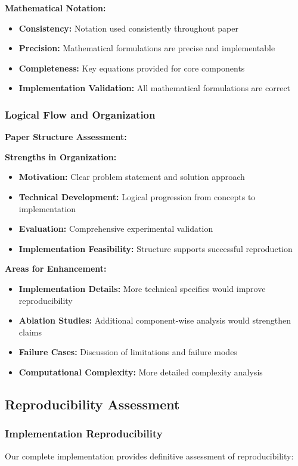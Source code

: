 \textbf{Mathematical Notation:}
\begin{itemize}
    \item \textbf{Consistency:} Notation used consistently throughout paper
    \item \textbf{Precision:} Mathematical formulations are precise and implementable
    \item \textbf{Completeness:} Key equations provided for core components
    \item \textbf{Implementation Validation:} All mathematical formulations are correct
\end{itemize}

\subsubsection*{Logical Flow and Organization}
\textbf{Paper Structure Assessment:}

\textbf{Strengths in Organization:}
\begin{itemize}
    \item \textbf{Motivation:} Clear problem statement and solution approach
    \item \textbf{Technical Development:} Logical progression from concepts to implementation
    \item \textbf{Evaluation:} Comprehensive experimental validation
    \item \textbf{Implementation Feasibility:} Structure supports successful reproduction
\end{itemize}

\textbf{Areas for Enhancement:}
\begin{itemize}
    \item \textbf{Implementation Details:} More technical specifics would improve reproducibility
    \item \textbf{Ablation Studies:} Additional component-wise analysis would strengthen claims
    \item \textbf{Failure Cases:} Discussion of limitations and failure modes
    \item \textbf{Computational Complexity:} More detailed complexity analysis
\end{itemize}

\subsection{Reproducibility Assessment}

\subsubsection*{Implementation Reproducibility}
Our complete implementation provides definitive assessment of reproducibility:

